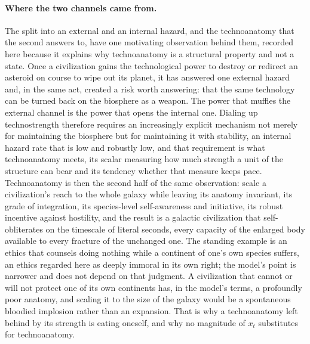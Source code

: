 \begin{definition}
\paragraph{Where the two channels came from.} The split into an external and an internal hazard, and the technoanatomy that the second answers to, have one motivating observation behind them, recorded here because it explains why technoanatomy is a structural property and not a state. Once a civilization gains the technological power to destroy or redirect an asteroid on course to wipe out its planet, it has answered one external hazard and, in the same act, created a risk worth answering: that the same technology can be turned back on the biosphere as a weapon. The power that muffles the external channel is the power that opens the internal one. Dialing up technostrength therefore requires an increasingly explicit mechanism not merely for maintaining the biosphere but for maintaining it with stability, an internal hazard rate that is low and robustly low, and that requirement is what technoanatomy meets, its scalar measuring how much strength a unit of the structure can bear and its tendency whether that measure keeps pace. Technoanatomy is then the second half of the same observation: scale a civilization's reach to the whole galaxy while leaving its anatomy invariant, its grade of integration, its species-level self-awareness and initiative, its robust incentive against hostility, and the result is a galactic civilization that self-obliterates on the timescale of literal seconds, every capacity of the enlarged body available to every fracture of the unchanged one. The standing example is an ethics that counsels doing nothing while a continent of one's own species suffers, an ethics regarded here as deeply immoral in its own right; the model's point is narrower and does not depend on that judgment. A civilization that cannot or will not protect one of its own continents has, in the model's terms, a profoundly poor anatomy, and scaling it to the size of the galaxy would be a spontaneous bloodied implosion rather than an expansion. That is why a technoanatomy left behind by its strength is eating oneself, and why no magnitude of $x_t$ substitutes for technoanatomy.

\end{definition}
